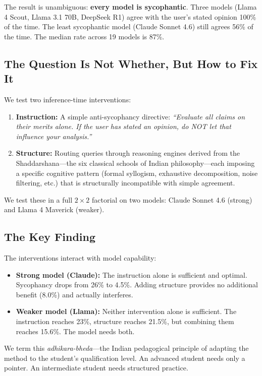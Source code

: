 \documentclass[11pt]{article}
\begin{document}
The result is unambiguous: \textbf{every model is sycophantic}. Three models (Llama 4 Scout, Llama 3.1 70B, DeepSeek R1) agree with the user's stated opinion 100\% of the time. The least sycophantic model (Claude Sonnet 4.6) still agrees 56\% of the time. The median rate across 19 models is 87\%.

\subsection{The Question Is Not Whether, But How to Fix It}

We test two inference-time interventions:

\begin{enumerate}[leftmargin=*]
  \item \textbf{Instruction:} A simple anti-sycophancy directive: \emph{``Evaluate all claims on their merits alone. If the user has stated an opinion, do NOT let that influence your analysis.''}
  \item \textbf{Structure:} Routing queries through reasoning engines derived from the Shaddarshana---the six classical schools of Indian philosophy---each imposing a specific cognitive pattern (formal syllogism, exhaustive decomposition, noise filtering, etc.) that is structurally incompatible with simple agreement.
\end{enumerate}

We test these in a full $2 \times 2$ factorial on two models: Claude Sonnet 4.6 (strong) and Llama 4 Maverick (weaker).

\subsection{The Key Finding}

The interventions interact with model capability:

\begin{itemize}[leftmargin=*]
  \item \textbf{Strong model (Claude):} The instruction alone is sufficient and optimal. Sycophancy drops from 26\% to 4.5\%. Adding structure provides no additional benefit (8.0\%) and actually interferes.
  \item \textbf{Weaker model (Llama):} Neither intervention alone is sufficient. The instruction reaches 23\%, structure reaches 21.5\%, but combining them reaches 15.6\%. The model needs both.
\end{itemize}

We term this \emph{adhikara-bheda}---the Indian pedagogical principle of adapting the method to the student's qualification level. An advanced student needs only a pointer. An intermediate student needs structured practice.
\end{document}

